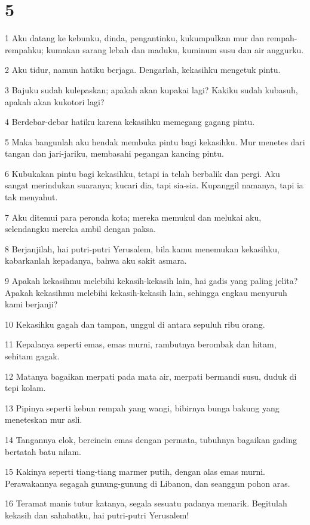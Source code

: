 \chapter{5}

\par 1 Aku datang ke kebunku, dinda, pengantinku, kukumpulkan mur dan rempah-rempahku; kumakan sarang lebah dan maduku, kuminum susu dan air anggurku.
\par 2 Aku tidur, namun hatiku berjaga. Dengarlah, kekasihku mengetuk pintu.
\par 3 Bajuku sudah kulepaskan; apakah akan kupakai lagi? Kakiku sudah kubasuh, apakah akan kukotori lagi?
\par 4 Berdebar-debar hatiku karena kekasihku memegang gagang pintu.
\par 5 Maka bangunlah aku hendak membuka pintu bagi kekasihku. Mur menetes dari tangan dan jari-jariku, membasahi pegangan kancing pintu.
\par 6 Kubukakan pintu bagi kekasihku, tetapi ia telah berbalik dan pergi. Aku sangat merindukan suaranya; kucari dia, tapi sia-sia. Kupanggil namanya, tapi ia tak menyahut.
\par 7 Aku ditemui para peronda kota; mereka memukul dan melukai aku, selendangku mereka ambil dengan paksa.
\par 8 Berjanjilah, hai putri-putri Yerusalem, bila kamu menemukan kekasihku, kabarkanlah kepadanya, bahwa aku sakit asmara.
\par 9 Apakah kekasihmu melebihi kekasih-kekasih lain, hai gadis yang paling jelita? Apakah kekasihmu melebihi kekasih-kekasih lain, sehingga engkau menyuruh kami berjanji?
\par 10 Kekasihku gagah dan tampan, unggul di antara sepuluh ribu orang.
\par 11 Kepalanya seperti emas, emas murni, rambutnya berombak dan hitam, sehitam gagak.
\par 12 Matanya bagaikan merpati pada mata air, merpati bermandi susu, duduk di tepi kolam.
\par 13 Pipinya seperti kebun rempah yang wangi, bibirnya bunga bakung yang meneteskan mur asli.
\par 14 Tangannya elok, bercincin emas dengan permata, tubuhnya bagaikan gading bertatah batu nilam.
\par 15 Kakinya seperti tiang-tiang marmer putih, dengan alas emas murni. Perawakannya segagah gunung-gunung di Libanon, dan seanggun pohon aras.
\par 16 Teramat manis tutur katanya, segala sesuatu padanya menarik. Begitulah kekasih dan sahabatku, hai putri-putri Yerusalem!

